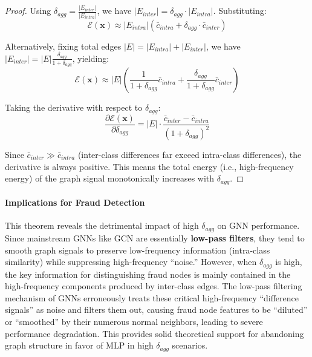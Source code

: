 \begin{proof}
Using $\delta_{agg} = \frac{|E_{inter}|}{|E_{intra}|}$, we have $|E_{inter}| = \delta_{agg} \cdot |E_{intra}|$. Substituting:
\begin{equation}
\mathcal{E}(\mathbf{x}) \approx |E_{intra}| \left( \bar{c}_{intra} + \delta_{agg} \cdot \bar{c}_{inter} \right)
\end{equation}

Alternatively, fixing total edges $|E| = |E_{intra}| + |E_{inter}|$, we have $|E_{inter}| = |E| \frac{\delta_{agg}}{1+\delta_{agg}}$, yielding:
\begin{equation}
\mathcal{E}(\mathbf{x}) \approx |E| \left( \frac{1}{1+\delta_{agg}}\bar{c}_{intra} + \frac{\delta_{agg}}{1+\delta_{agg}}\bar{c}_{inter} \right)
\end{equation}

Taking the derivative with respect to $\delta_{agg}$:
\begin{equation}
\frac{\partial \mathcal{E}(\mathbf{x})}{\partial \delta_{agg}} = |E| \cdot \frac{\bar{c}_{inter} - \bar{c}_{intra}}{(1+\delta_{agg})^2}
\end{equation}

Since $\bar{c}_{inter} \gg \bar{c}_{intra}$ (inter-class differences far exceed intra-class differences), the derivative is always positive.
This means the total energy (i.e., high-frequency energy) of the graph signal monotonically increases with $\delta_{agg}$.
\end{proof}

\paragraph{Implications for Fraud Detection}
This theorem reveals the detrimental impact of high $\delta_{agg}$ on GNN performance. Since mainstream GNNs like GCN are essentially \textbf{low-pass filters}, they tend to smooth graph signals to preserve low-frequency information (intra-class similarity) while suppressing high-frequency ``noise.''
However, when $\delta_{agg}$ is high, the key information for distinguishing fraud nodes is mainly contained in the high-frequency components produced by inter-class edges. The low-pass filtering mechanism of GNNs erroneously treats these critical high-frequency ``difference signals'' as noise and filters them out, causing fraud node features to be ``diluted'' or ``smoothed'' by their numerous normal neighbors, leading to severe performance degradation. This provides solid theoretical support for abandoning graph structure in favor of MLP in high $\delta_{agg}$ scenarios.

